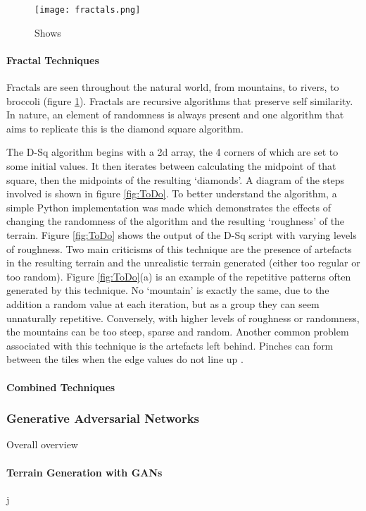\documentclass[a4paper]{report}
\begin{document}
\begin{figure}[H]
    \centering
        \texttt{[image: fractals.png]}
        \caption{Shows }
        \label{fig:fractals}
\end{figure}

\paragraph{Fractal Techniques}

Fractals are seen throughout the natural world, from mountains, to rivers, to broccoli (figure \ref{fig:fractals}). Fractals are recursive algorithms that preserve self similarity. In nature, an element of randomness is always present and one algorithm that aims to replicate this is the diamond square algorithm.

The D-Sq algorithm begins with a 2d array, the 4 corners of which are set to some initial values. It then iterates between calculating the midpoint of that square, then the midpoints of the resulting `diamonds'. A diagram of the steps involved is shown in figure \ref{fig:ToDo}. To better understand the algorithm, a simple Python implementation was made which demonstrates the effects of changing the randomness of the algorithm and the resulting `roughness' of the terrain. Figure \ref{fig:ToDo} shows the output of the D-Sq script with varying levels of roughness. Two main criticisms of this technique are the presence of artefacts in the resulting terrain and the unrealistic terrain generated (either too regular or too random)\cite{Dsq}. Figure \ref{fig:ToDo}(a) is an example of the repetitive patterns often generated by this technique. No `mountain' is exactly the same, due to the addition a random value at each iteration, but as a group they can seem unnaturally repetitive. Conversely, with higher levels of roughness or randomness, the mountains can be too steep, sparse and random. Another common problem associated with this technique is the artefacts left behind. Pinches can form between the tiles when the edge values do not line up \cite{ToDo}. 

\paragraph{Combined Techniques}
\subsubsection{Generative Adversarial Networks}
Overall overview
\paragraph{Terrain Generation with GANs}
j
\end{document}

